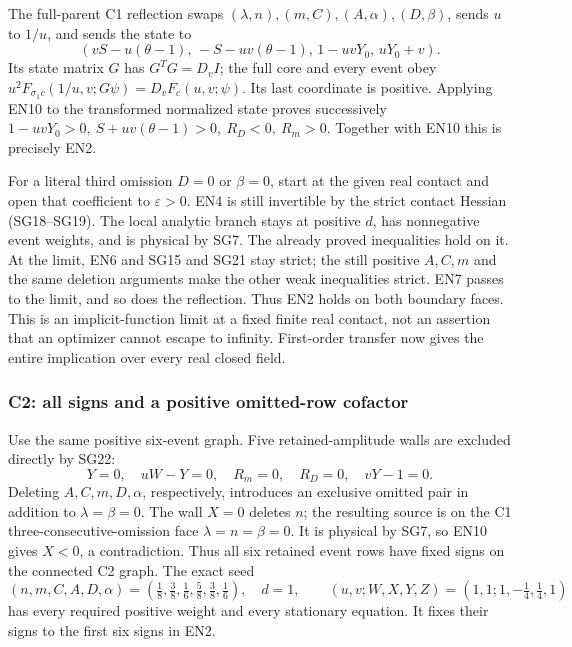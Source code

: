 The full-parent C1 reflection swaps
\((\lambda,n),(m,C),(A,\alpha),(D,\beta)\), sends \(u\) to \(1/u\),
and sends the state to
\[
 (vS-u(\theta-1),\,-S-uv(\theta-1),\,
                   1-uvY_0,\,uY_0+v).
\]
Its state matrix \(G\) has \(G^TG=D_vI\); the full core and every event
obey \(u^2F_{\sigma_1c}(1/u,v;G\psi)=D_vF_c(u,v;\psi)\).
Its last coordinate is positive.
Applying EN10 to the transformed normalized state proves successively
\(1-uvY_0>0,\ S+uv(\theta-1)>0,\ R_D<0,\ R_m>0\).
Together with EN10 this is precisely EN2.

For a literal third omission \(D=0\) or \(\beta=0\), start at the
given real contact and open that coefficient to \(\varepsilon>0\).
EN4 is still invertible by the strict contact Hessian (SG18--SG19).  The local analytic branch stays at
positive \(d\), has nonnegative event weights, and is physical by SG7.
The already proved inequalities hold on it.  At the limit, EN6 and
SG15 and SG21 stay strict; the still positive \(A,C,m\) and the same deletion
arguments make the other weak inequalities strict.  EN7 passes to
the limit, and so does the reflection.  Thus EN2 holds on both
boundary faces.  This is an implicit-function limit at a fixed
finite real contact, not an assertion that an optimizer cannot escape
to infinity.  First-order transfer now gives the entire implication
over every real closed field.

\subsubsection*{C2: all signs and a positive omitted-row cofactor}

Use the same positive six-event graph.  Five retained-amplitude walls
are excluded directly by SG22:
\[
 Y=0,\quad uW-Y=0,\quad R_m=0,\quad R_D=0,\quad vY-1=0.
 \tag{EN11}
\]
Deleting \(A,C,m,D,\alpha\), respectively, introduces an exclusive
omitted pair in addition to \(\lambda=\beta=0\).
The wall \(X=0\) deletes \(n\); the resulting source is on the C1
three-consecutive-omission face \(\lambda=n=\beta=0\).
It is physical by SG7, so EN10 gives \(X<0\), a contradiction.
Thus all six retained event rows have fixed signs on the connected
C2 graph.  The exact seed
\[
 (n,m,C,A,D,\alpha)=(\tfrac18,\tfrac38,\tfrac16,
                              \tfrac58,\tfrac38,\tfrac16),\quad d=1,
 \qquad (u,v;W,X,Y,Z)=(1,1;1,-\tfrac14,\tfrac14,1)
\]
has every required positive weight and every stationary equation.
It fixes their signs to the first six signs in EN2.


